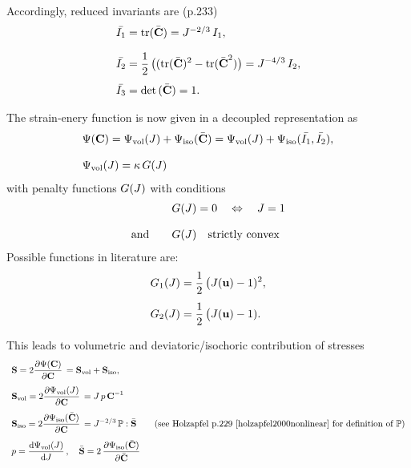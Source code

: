 Accordingly, reduced invariants are (p.233)
\begin{equation*}
  \begin{array}{lll}
    \bar{I_1} = \mathrm{tr}(\bar{\textbf{C}}) = J^{-2/3}\,I_1,\\[4mm]
    \bar{I_2} = \displaystyle\frac{\displaystyle{1}}{\displaystyle{2}}\,\big((\mathrm{tr}(\bar{\textbf{C}})^2 - \mathrm{tr}(\bar{\textbf{C}}^2)\big) = J^{-4/3}\,I_2,\\[4mm]
    \bar{I_3} = \hbox{det} \,(\bar{\textbf{C}}) = 1.
  \end{array}
\end{equation*}

The strain-enery function is now given in a decoupled representation as
\begin{equation*}
  \begin{array}{lll}
    \Psi(\textbf{C}) = \Psi_\text{vol}(J) + \Psi_\text{iso}(\bar{\textbf{C}}) = \Psi_\text{vol}(J) + \Psi_\text{iso}(\bar{I_1}, \bar{I_2}),\\[4mm]
    \Psi_\text{vol}(J) = \kappa\,G(J)
  \end{array}
\end{equation*}
with penalty functions $G(J)$ with conditions
\begin{equation*}
  \begin{array}{lll}
    & G(J) = 0 \quad\Leftrightarrow\quad J = 1\\[4mm]
    \text{and}\quad &G(J) \quad \text{strictly convex}
  \end{array}
\end{equation*}
Possible functions in literature are:
\begin{equation*}
  \begin{array}{lll}
    G_1(J) = \displaystyle\frac{\displaystyle{1}}{\displaystyle{2}}\,\big(J(\textbf{u}) - 1)^2,\\[4mm]
    G_2(J) = \displaystyle\frac{\displaystyle{1}}{\displaystyle{2}}\,\big(J(\textbf{u}) - 1).
  \end{array} 
\end{equation*}
 
This leads to volumetric and deviatoric/isochoric contribution of stresses
\begin{equation}\label{eq:stress_split}
  \begin{array}{lll}
    \bfS = 2\p{\Psi(\bfC)}{\bfC} = \bfS_\text{vol} + \bfS_\text{iso},\\[4mm]
    \bfS_\text{vol} = 2\p{\Psi_\text{vol}(J)}{\bfC} = J\,p\,\bfC^{-1}\\[4mm]
    \bfS_\text{iso} = 2\p{\Psi_\text{iso}(\bar{\bfC})}{\bfC} = J^{-2/3}\,\mathbb{P} : \bar{\bfS} \qquad \text{(see Holzapfel p.229 \cite{holzapfel2000nonlinear} for definition of $\mathbb{P}$)}\\[4mm]
    p = \d{\Psi_\text{vol}(J)}{J}, \quad \bar{\bfS} = 2\,\p{\Psi_\text{iso}(\bar{\bfC})}{\bar{\bfC}}
  \end{array}
\end{equation}

